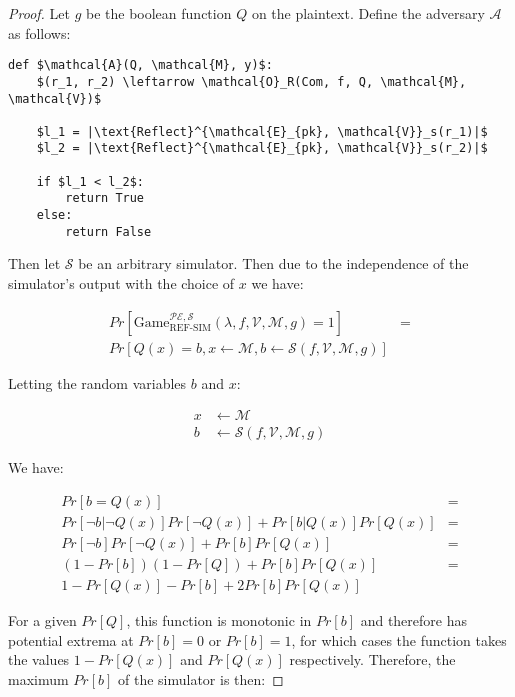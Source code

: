 \documentclass[a4paper, 11 pt, conference]{article}
\begin{document}
\begin{proof}

Let $g$ be the boolean function $Q$ on the plaintext. Define the adversary
$\mathcal{A}$ as follows:

\begin{lstlisting}[texcl,mathescape]
def $\mathcal{A}(Q, \mathcal{M}, y)$:
    $(r_1, r_2) \leftarrow \mathcal{O}_R(Com, f, Q, \mathcal{M}, \mathcal{V})$

    $l_1 = |\text{Reflect}^{\mathcal{E}_{pk}, \mathcal{V}}_s(r_1)|$
    $l_2 = |\text{Reflect}^{\mathcal{E}_{pk}, \mathcal{V}}_s(r_2)|$

    if $l_1 < l_2$:
        return True
    else:
        return False
\end{lstlisting}

Then let $\mathcal{S}$ be an arbitrary simulator. Then due to the independence of the simulator's output with the choice of $x$ we have:

\begin{align*}
    Pr[\text{Game}_{\text{REF-SIM}}^{\mathcal{PE},\mathcal{S}}(\lambda, f, \mathcal{V}, \mathcal{M}, g) = 1] &=\\
    Pr[Q(x) = b, x \leftarrow \mathcal{M}, b \leftarrow \mathcal{S}(f, \mathcal{V}, \mathcal{M}, g)]
\end{align*}

Letting the random variables $b$ and $x$:

\begin{align*}
    x &\leftarrow \mathcal{M}\\
    b &\leftarrow \mathcal{S}(f, \mathcal{V}, \mathcal{M}, g)
\end{align*}

We have:

\begin{align*}
    Pr[b = Q(x)] &=\\
    Pr[\lnot b|\lnot Q(x)]Pr[\lnot Q(x)] + Pr[b|Q(x)]Pr[Q(x)] &=\\
    Pr[\lnot b]Pr[\lnot Q(x)] + Pr[b]Pr[Q(x)] &=\\
    (1 - Pr[b])(1 - Pr[Q]) + Pr[b]Pr[Q(x)] &=\\
    1 - Pr[Q(x)] - Pr[b] + 2Pr[b]Pr[Q(x)]
\end{align*}

For a given $Pr[Q]$, this function is monotonic in $Pr[b]$ and therefore has potential extrema
at $Pr[b] = 0$ or $Pr[b] = 1$, for which cases the function takes the values $1 - Pr[Q(x)]$ and
$Pr[Q(x)]$ respectively. Therefore, the maximum $Pr[b]$ of the simulator is then:


\end{proof}
\end{document}
